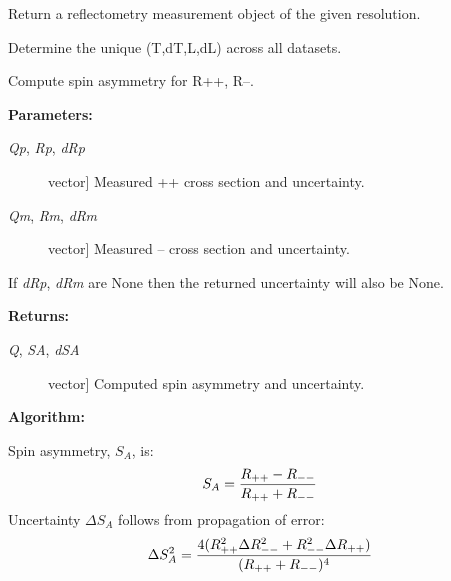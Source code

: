 \documentclass[letterpaper,10pt,english]{sphinxmanual}
\begin{document}

\begin{fulllineitems}
\label{api/probe:refl1d.probe.make_probe}
Return a reflectometry measurement object of the given resolution.

\end{fulllineitems}


\begin{fulllineitems}
\label{api/probe:refl1d.probe.measurement_union}
Determine the unique (T,dT,L,dL) across all datasets.

\end{fulllineitems}


\begin{fulllineitems}
\label{api/probe:refl1d.probe.spin_asymmetry}
Compute spin asymmetry for R++, R--.

\textbf{Parameters:}
\begin{description}
\item[{\emph{Qp}, \emph{Rp}, \emph{dRp}}] \leavevmode{[}vector{]}
Measured ++ cross section and uncertainty.

\item[{\emph{Qm}, \emph{Rm}, \emph{dRm}}] \leavevmode{[}vector{]}
Measured -- cross section and uncertainty.

\end{description}

If \emph{dRp}, \emph{dRm} are None then the returned uncertainty will also be None.

\textbf{Returns:}
\begin{description}
\item[{\emph{Q}, \emph{SA}, \emph{dSA}}] \leavevmode{[}vector{]}
Computed spin asymmetry and uncertainty.

\end{description}

\textbf{Algorithm:}

Spin asymmetry, $S_A$, is:
\begin{gather}
\begin{split}S_A = \frac{R_{++} - R_{--}}{R_{++} + R_{--}}\end{split}\notag
\end{gather}
Uncertainty $\Delta S_A$ follows from propagation of error:
\begin{gather}
\begin{split}\Delta S_A^2 = \frac{4(R_{++}^2\Delta R_{--}^2+R_{--}^2\Delta R_{++})}
                    {(R_{++} + R_{--})^4}\end{split}\notag
\end{gather}
\end{fulllineitems}
\end{document}
